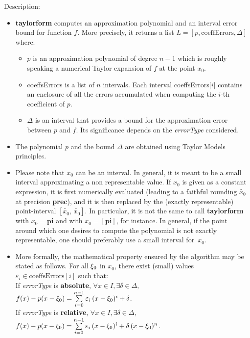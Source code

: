 \noindent Description: \begin{itemize}

\item \textbf{taylorform} computes an approximation polynomial and an interval error bound
   for function $f$. More precisely, it returns a list $L = \left[p, \textrm{coeffErrors},\Delta \right]$
   where:
   \begin{itemize}
   \item $p$ is an approximation polynomial of degree $n-1$ which is roughly speaking
   a numerical Taylor expansion of $f$ at the point $x_0$.
   \item coeffsErrors is a list of $n$ intervals. Each interval coeffsErrors[$i$]
   contains an enclosure of all the errors accumulated when computing the $i$-th
   coefficient of $p$.
   \item $\Delta$ is an interval that provides a bound for the approximation error
   between $p$ and $f$. Its significance depends on the \emph{errorType} considered.
   \end{itemize}

\item The polynomial $p$ and the bound  $\Delta$ are obtained using Taylor Models
   principles.

\item Please note that $x_0$ can be an interval. In general, it is meant to be a
   small interval approximating a non representable value. If $x_0$ is given as a
   constant expression, it is first numerically evaluated (leading to a faithful
   rounding $\tilde{x_0}$ at precision \textbf{prec}), and it is then replaced by the (exactly
   representable) point-interval $[\tilde{x_0},\,\tilde{x_0}]$. In particular, it is not
   the same to call \textbf{taylorform} with $x_0 = \textbf{pi}$ and with $x_0 = [\textbf{pi}]$, for instance.
   In general, if the point around which one desires to compute the polynomial
   is not exactly representable, one should preferably use a small interval
   for~$x_0$.

\item More formally, the mathematical property ensured by the algorithm may be
   stated as follows. For all $\xi_0$ in $x_0$, there exist (small) values
   $\varepsilon_i \in \textrm{coeffsErrors}[i]$ such that:
   \\
   If \emph{errorType} is \textbf{absolute}, $\forall x \in I, \exists \delta \in \Delta,\,$
   $f(x)-p(x-\xi_0) = \sum\limits_{i=0}^{n-1} \varepsilon_i\, (x-\xi_0)^i + \delta$.
   \\
   If \emph{errorType} is \textbf{relative}, $\forall x \in I, \exists \delta \in \Delta,\,$
   $f(x)-p(x-\xi_0) = \sum\limits_{i=0}^{n-1} \varepsilon_i\, (x-\xi_0)^i + \delta\,(x-\xi_0)^n$.


\end{itemize}
